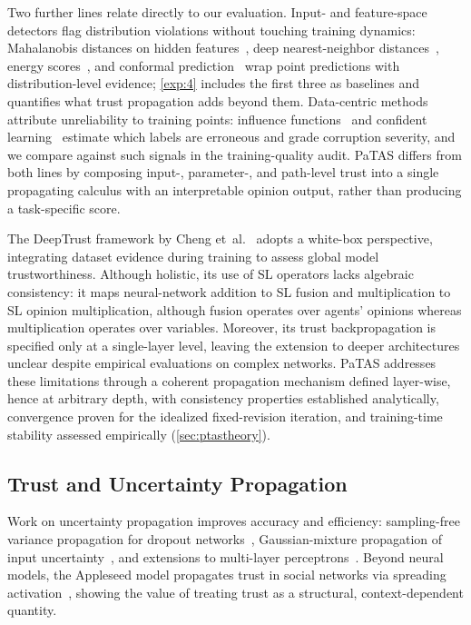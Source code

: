 Two further lines relate directly to our evaluation. Input- and feature-space detectors flag distribution violations without touching training dynamics: Mahalanobis distances on hidden features~\cite{lee2018mahalanobis}, deep nearest-neighbor distances~\cite{sun2022knnood}, energy scores~\cite{liu2020energy}, and conformal prediction~\cite{angelopoulos2023conformal} wrap point predictions with distribution-level evidence; \cref{exp:4} includes the first three as baselines and quantifies what trust propagation adds beyond them. Data-centric methods attribute unreliability to training points: influence functions~\cite{koh2017influence} and confident learning~\cite{northcutt2021confidentlearning} estimate which labels are erroneous and grade corruption severity, and we compare against such signals in the training-quality audit. PaTAS differs from both lines by composing input-, parameter-, and path-level trust into a single propagating calculus with an interpretable opinion output, rather than producing a task-specific score.

The DeepTrust framework by Cheng et~al.~\cite{10.3389/frai.2020.00054} adopts a white-box perspective, integrating dataset evidence during training to assess global model trustworthiness. Although holistic, its use of SL operators lacks algebraic consistency: it maps neural-network addition to SL fusion and multiplication to SL opinion multiplication, although fusion operates over agents' opinions whereas multiplication operates over variables. Moreover, its trust backpropagation is specified only at a single-layer level, leaving the extension to deeper architectures unclear despite empirical evaluations on complex networks. PaTAS addresses these limitations through a coherent propagation mechanism defined layer-wise, hence at arbitrary depth, with consistency properties established analytically, convergence proven for the idealized fixed-revision iteration, and training-time stability assessed empirically (\cref{sec:ptastheory}).
\vspace{-0.5em}
\subsection{Trust and Uncertainty Propagation}

Work on uncertainty propagation improves accuracy and efficiency: sampling-free variance propagation for dropout networks~\cite{MAE2021394}, Gaussian-mixture propagation of input uncertainty~\cite{pmlr-v202-monchot23a}, and extensions to multi-layer perceptrons~\cite{astudillo2011propagation}. Beyond neural models, the Appleseed model propagates trust in social networks via spreading activation~\cite{ziegler2004spreading}, showing the value of treating trust as a structural, context-dependent quantity.

